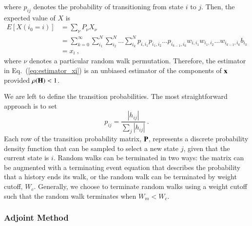 \documentclass[preprint,12pt]{elsarticle}
\newcommand{\vx}{\ensuremath{\ve{x}}}
\newcommand{\vH}{\ensuremath{\ve{H}}}
\newcommand{\vP}{\ensuremath{\ve{P}}}
\begin{document}
where $p_{ij}$ denotes the probability of transitioning from state $i$
to $j$. Then, the expected value of $X$ is
\begin{equation}
  \begin{split}
    E[X(i_0=i)] &= \sum_{\nu}P_\nu X_\nu\\ &=
    \sum_{k=0}^{\infty}\sum_{i_1}^{N}\sum_{i_2}^{N}\ldots
    \sum_{i_k}^{N}p_{i,i_1}p_{i_1,i_2}\ldots p_{i_{k-1},i_k}
    w_{i,i_1}w_{i_1,i_2}\dots w_{i_{k-1},i_k}b_{i_k}\\ &= x_i\:,
  \end{split}
  \label{eq:expectation_xi}
\end{equation}
where $\nu$ denotes a particular random walk permutation.  Therefore,
the estimator in Eq.~(\ref{eq:estimator_xi}) is an unbiased estimator
of the components of $\vx$ provided $\rho(\vH) < 1$.

We are left to define the transition probabilities. The most
straightforward approach is to set
\begin{equation}
  p_{ij} = \frac{|h_{ij}|}{\sum_{j}|h_{ij}|}\:.
  \label{eq:probability}
\end{equation}
Each row of the transition probability matrix, $\vP$, represents a discrete
probability density function that can be sampled to select a new state $j$,
given that the current state is $i$.  Random walks can be terminated in two
ways: the matrix can be augmented with a terminating event equation that
describes the probability that a history ends its walk, or the random walk can
be terminated by weight cutoff, $W_c$.  Generally, we choose to terminate
random walks using a weight cutoff such that the random walk terminates when
$W_m < W_c$.

\subsubsection{Adjoint Method}
\label{sec:adjoint-method}
\end{document}
